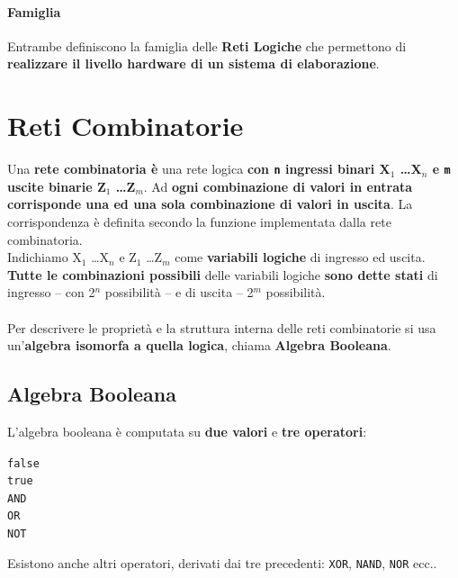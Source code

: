 \documentclass[10pt]{report}
\begin{document}
\paragraph{Famiglia} Entrambe definiscono la famiglia delle \textbf{Reti Logiche} che permettono di \textbf{realizzare il livello hardware di un sistema di elaborazione}.
\section{Reti Combinatorie}
Una \textbf{rete combinatoria è} una rete logica \textbf{con \texttt{n} ingressi binari X$_{1}$ \ldots X$_{n}$ e \texttt{m} uscite binarie Z$_{1}$ \ldots Z$_{m}$}. Ad \textbf{ogni combinazione di valori in entrata corrisponde una ed una sola combinazione di valori in uscita}. La corrispondenza è definita secondo la funzione implementata dalla rete combinatoria.\\
Indichiamo X$_{1}$ \ldots X$_{n}$ e Z$_{1}$ \ldots Z$_{m}$ come \textbf{variabili logiche} di ingresso ed uscita. \textbf{Tutte le combinazioni possibili} delle variabili logiche \textbf{sono dette stati} di ingresso -- con 2$^n$ possibilità -- e di uscita -- 2$^m$ possibilità.\\\\
Per descrivere le proprietà e la struttura interna delle reti combinatorie si usa un'\textbf{algebra isomorfa a quella logica}, chiama \textbf{Algebra Booleana}.
\subsection{Algebra Booleana}
L'algebra booleana è computata su \textbf{due valori} e \textbf{tre operatori}:
\begin{center}
\begin{multicols}{2}
\texttt{false}\\\texttt{true}\\
\columnbreak
\texttt{AND}\\\texttt{OR}\\\texttt{NOT}
\end{multicols}
\end{center}
Esistono anche altri operatori, derivati dai tre precedenti: \texttt{XOR}, \texttt{NAND}, \texttt{NOR} ecc..
\end{document}
